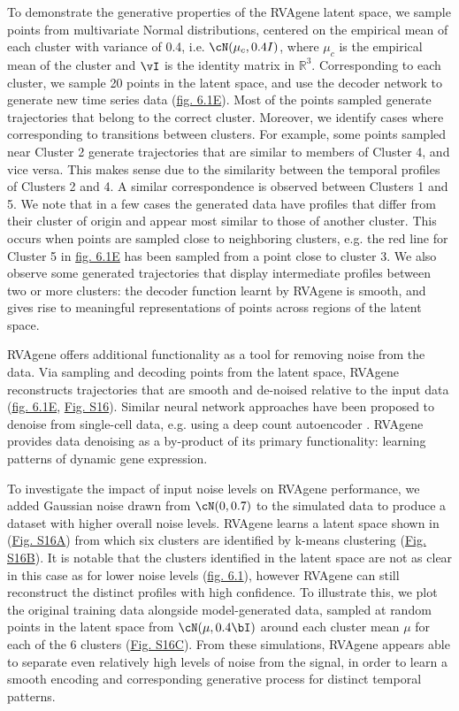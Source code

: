To demonstrate the generative properties of the RVAgene latent space, we sample points from
multivariate Normal distributions, centered on the empirical mean of each cluster with variance of
0.4, i.e. $\cN(\mu_c, 0.4I)$, where $\mu_c$ is the empirical mean of the cluster and $\vI$ is the
identity matrix in $\mathbb{R}^3$. Corresponding to each cluster, we sample 20 points in the latent
space, and use the decoder network to generate new time series data (\hyperref[fig:fig2]{fig. 6.1E}). Most of the points sampled generate trajectories that belong to the correct cluster. Moreover, we identify cases where  corresponding to transitions between clusters. For example, some points sampled near Cluster 2 generate trajectories that are similar to members of Cluster 4, and vice versa. This makes sense due to the similarity between the temporal profiles of Clusters 2 and 4. A similar correspondence is observed between Clusters 1 and 5.
{We note that in a few cases the generated data have profiles that differ from their cluster of
origin and appear most similar to those of another cluster. This occurs when points are sampled
close to neighboring clusters, e.g. the red line for Cluster 5 in \hyperref[fig:fig2]{fig. 6.1E} has been sampled from a point close to cluster 3.}
We also observe some generated trajectories that display intermediate profiles between two or more clusters: the decoder function learnt by RVAgene is smooth, and gives rise to meaningful representations of points across regions of the latent space. 
\par
RVAgene offers additional functionality as a tool for removing noise from the data. Via sampling and
decoding points from the latent space, RVAgene reconstructs trajectories that are smooth and
de-noised relative to the input data (\hyperref[fig:fig2]{fig. 6.1E}, \hyperref[fig:figS1]{Fig. S16}). Similar neural network approaches have been proposed to denoise from single-cell data, e.g. using a deep count autoencoder \citep{eraslan2019single}. RVAgene provides data denoising as a by-product of its primary functionality: learning patterns of dynamic gene expression.
\par
{To investigate the impact of input noise levels on RVAgene performance, we added Gaussian noise
drawn from $\cN(0,0.7)$ to the simulated data to produce a dataset with higher overall noise levels.
RVAgene learns a latent space shown in (\hyperref[fig:figS1]{Fig. S16A}) from which six clusters are
identified by k-means clustering (\hyperref[fig:figS1]{Fig. S16B}). It is notable that the clusters
identified in the latent space are not as clear in this case as for lower noise levels
(\hyperref[fig:fig2]{fig. 6.1}), however RVAgene can still reconstruct the distinct profiles with high confidence. To illustrate this, we plot the original training data alongside model-generated data, sampled at random points in the latent space from  $\cN(\mu,0.4\bI)$ around each cluster mean $\mu$ for each of the 6 clusters (\hyperref[fig:figS1]{Fig. S16C}). From these simulations, RVAgene appears able to separate even relatively high levels of noise from the signal, in order to learn a smooth encoding and corresponding generative process for distinct temporal patterns.}

